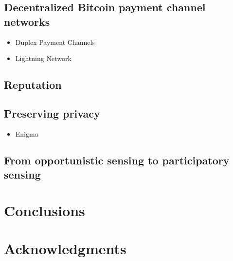 \documentclass{sig-alternate}
\begin{document}
	\subsection{Decentralized Bitcoin payment channel networks}

	\begin{itemize}
	\item Duplex Payment Channels
	\item Lightning Network
	\end{itemize}

	\subsection{Reputation}

	\subsection{Preserving privacy}

	\begin{itemize}
	\item Enigma
	\end{itemize}

	\subsection{From opportunistic sensing to participatory sensing}

\section{Conclusions}

\section{Acknowledgments}

%

%
%
\end{document}
